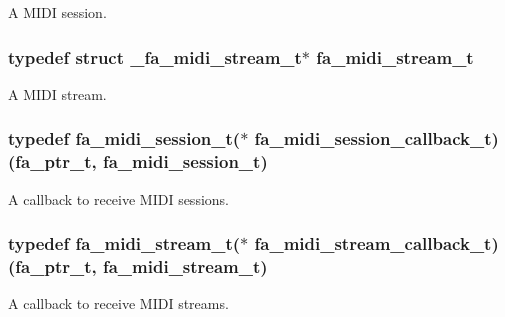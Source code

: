 A M\-I\-D\-I session. 

\hypertarget{group___fa_midi_ga85772039b62d8bb718a51e1ffbbb2fa2}{
\subsubsection[{fa\-\_\-midi\-\_\-stream\-\_\-t}]{\setlength{\rightskip}{0pt plus 5cm}typedef struct \-\_\-fa\-\_\-midi\-\_\-stream\-\_\-t$\ast$ {\bf fa\-\_\-midi\-\_\-stream\-\_\-t}}}\label{group___fa_midi_ga85772039b62d8bb718a51e1ffbbb2fa2}


A M\-I\-D\-I stream. 

\hypertarget{group___fa_midi_ga20fb39192d8af433b1506a529bc981e7}{
\subsubsection[{fa\-\_\-midi\-\_\-session\-\_\-callback\-\_\-t}]{\setlength{\rightskip}{0pt plus 5cm}typedef {\bf fa\-\_\-midi\-\_\-session\-\_\-t}($\ast$  fa\-\_\-midi\-\_\-session\-\_\-callback\-\_\-t)({\bf fa\-\_\-ptr\-\_\-t}, {\bf fa\-\_\-midi\-\_\-session\-\_\-t})}}\label{group___fa_midi_ga20fb39192d8af433b1506a529bc981e7}


A callback to receive M\-I\-D\-I sessions. 

\hypertarget{group___fa_midi_ga8022098ffcf993ccdaed068b97ab7bfc}{
\subsubsection[{fa\-\_\-midi\-\_\-stream\-\_\-callback\-\_\-t}]{\setlength{\rightskip}{0pt plus 5cm}typedef {\bf fa\-\_\-midi\-\_\-stream\-\_\-t}($\ast$  fa\-\_\-midi\-\_\-stream\-\_\-callback\-\_\-t)({\bf fa\-\_\-ptr\-\_\-t}, {\bf fa\-\_\-midi\-\_\-stream\-\_\-t})}}\label{group___fa_midi_ga8022098ffcf993ccdaed068b97ab7bfc}


A callback to receive M\-I\-D\-I streams. 

